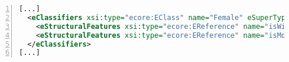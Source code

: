 \begin{lstlisting}[caption=Auszug der Klasse Female aus Abbildung \ref{fig:Family-Tree-Model} als ECore in XML, label=lst:ecore-modell, language=xml, basicstyle=\small, tabsize=4,frame=single, showstringspaces=false, numbers=left, keywordstyle=\bfseries, breaklines=true]
[...]
  <eClassifiers xsi:type="ecore:EClass" name="Female" eSuperTypes="#//Person">
    <eStructuralFeatures xsi:type="ecore:EReference" name="isWife" eType="#//Male"/>
    <eStructuralFeatures xsi:type="ecore:EReference" name="isMother" upperBound="-1" eType="#//Person"/>
  </eClassifiers>
[...]
\end{lstlisting}